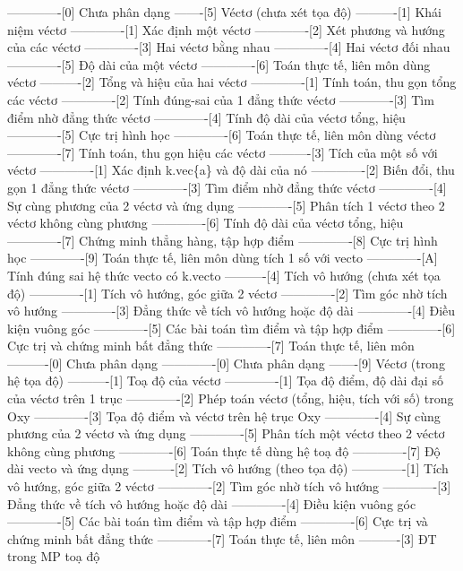 -------------[0] Chưa phân dạng
-------[5] Véctơ (chưa xét tọa độ)
----------[1] Khái niệm véctơ
-------------[1] Xác định một véctơ
-------------[2] Xét phương và hướng của các véctơ
-------------[3] Hai véctơ bằng nhau
-------------[4] Hai véctơ đối nhau
-------------[5] Độ dài của một véctơ
-------------[6] Toán thực tế, liên môn dùng véctơ
----------[2] Tổng và hiệu của hai véctơ
-------------[1] Tính toán, thu gọn tổng các véctơ
-------------[2] Tính đúng-sai của 1 đẳng thức véctơ
-------------[3] Tìm điểm nhờ đẳng thức véctơ
-------------[4] Tính độ dài của véctơ tổng, hiệu
-------------[5] Cực trị hình học
-------------[6] Toán thực tế, liên môn dùng véctơ
-------------[7] Tính toán, thu gọn hiệu các véctơ
----------[3] Tích của một số với véctơ
-------------[1] Xác định k.vec\{a\} và độ dài của nó
-------------[2] Biến đổi, thu gọn 1 đẳng thức véctơ
-------------[3] Tìm điểm nhờ đẳng thức véctơ
-------------[4] Sự cùng phương của 2 véctơ và ứng dụng
-------------[5] Phân tích 1 véctơ theo 2 véctơ không cùng phương
-------------[6] Tính độ dài của véctơ tổng, hiệu
-------------[7] Chứng minh thẳng hàng, tập hợp điểm
-------------[8] Cực trị hình học
-------------[9] Toán thực tế, liên môn dùng tích 1 số với vecto
-------------[A] Tính đúng sai hệ thức vecto có k.vecto
----------[4] Tích vô hướng (chưa xét tọa độ)
-------------[1] Tích vô hướng, góc giữa 2 véctơ
-------------[2] Tìm góc nhờ tích vô hướng
-------------[3] Đẳng thức về tích vô hướng hoặc độ dài
-------------[4] Điều kiện vuông góc
-------------[5] Các bài toán tìm điểm và tập hợp điểm
-------------[6] Cực trị và chứng minh bất đẳng thức
-------------[7] Toán thực tế, liên môn
----------[0] Chưa phân dạng
-------------[0] Chưa phân dạng
-------[9] Véctơ (trong hệ tọa độ)
----------[1] Toạ độ của véctơ
-------------[1] Tọa độ điểm, độ dài đại số của véctơ trên 1 trục
-------------[2] Phép toán véctơ (tổng, hiệu, tích với số) trong Oxy
-------------[3] Tọa độ điểm và véctơ trên hệ trục Oxy
-------------[4] Sự cùng phương của 2 véctơ và ứng dụng
-------------[5] Phân tích một véctơ theo 2 véctơ không cùng phương
-------------[6] Toán thực tế dùng hệ toạ độ
-------------[7] Độ dài vecto và ứng dụng
----------[2] Tích vô hướng (theo tọa độ)
-------------[1] Tích vô hướng, góc giữa 2 véctơ
-------------[2] Tìm góc nhờ tích vô hướng
-------------[3] Đẳng thức về tích vô hướng hoặc độ dài
-------------[4] Điều kiện vuông góc
-------------[5] Các bài toán tìm điểm và tập hợp điểm
-------------[6] Cực trị và chứng minh bất đẳng thức
-------------[7] Toán thực tế, liên môn
----------[3] ĐT trong MP toạ độ
